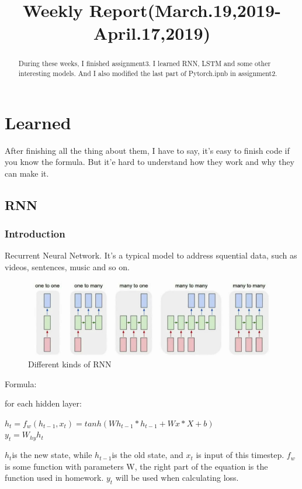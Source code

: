 \documentclass{article}
\title{Weekly Report(March.19,2019-April.17,2019)}
\begin{document}
\maketitle
\begin{abstract}
	During these weeks, I finished assignment3. I learned RNN, LSTM and some other interesting models. And I also modified the last part of Pytorch.ipnb in assignment2.
\end{abstract}

\section{Learned}
After finishing all the thing about them, I have to say, it's easy to finish code if you know the formula. But it'e hard to understand how they work and why they can make it. 
\subsection{RNN}
\subsubsection{Introduction}
Recurrent Neural Network. It's a typical model to address squential data, such as videos, sentences, music and so on.\\
\begin{figure}[h]
	\centering  %
	\includegraphics[width=1\textwidth]{1.png} 
	\caption{Different kinds of RNN}  %
	\label{fig:f1}   %
\end{figure}

Formula:

for each hidden layer:
\begin{center}
${\displaystyle h_t=f_w(h_{t-1}, x_t)=tanh(Wh_{t-1}*h_{t-1}+Wx*X+b)}$\\
${y_t=W_{hy}h_t}$
\end{center}
${h_t}$is the new state, while ${h_{t-1}}$is the old state, and ${x_t}$ is input of this timestep. ${f_w}$ is some function with parameters W, the right part of the equation is the function used in homework. ${y_t}$ will be used when calculating loss.
\end{document}
